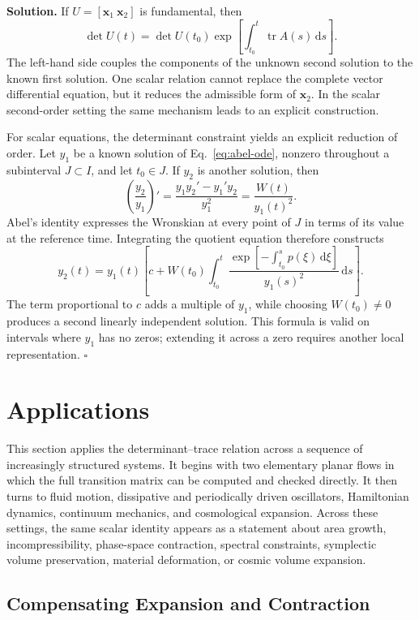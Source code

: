 \documentclass[11pt,a4paper]{article}
\newcommand{\be}{\begin{equation}}
\newcommand{\ee}{\end{equation}}
\newcommand{\lb}[1]{\label{#1}}
\newcommand{\dd}{\mathrm{d}}
\DeclareMathOperator{\tr}{tr}
\theoremstyle{definition}
\newenvironment{solution}
{\par\noindent\textbf{Solution.}}
{\hfill$\square$\par}
\numberwithin{equation}{section}
\begin{document}
\begin{solution}
If $U=[\mathbf{x}_1\ \mathbf{x}_2]$ is fundamental, then
\be
\det U(t)
=
\det U(t_0)
\exp\left[
\int_{t_0}^{t}\tr A(s)\,\dd s
\right].
\lb{eq:known-solution}
\ee
The left-hand side couples the components of the unknown second solution to the known first solution. One scalar relation cannot replace the complete vector differential equation, but it reduces the admissible form of $\mathbf{x}_2$. In the scalar second-order setting the same mechanism leads to an explicit construction.

For scalar equations, the determinant constraint yields an explicit reduction of order. Let $y_1$ be a known solution of Eq.~\eqref{eq:abel-ode}, nonzero throughout a subinterval $J\subset I$, and let $t_0\in J$. If $y_2$ is another solution, then
\be
\left(\frac{y_2}{y_1}\right)'
=\frac{y_1y_2'-y_1'y_2}{y_1^2}
=\frac{W(t)}{y_1(t)^2}.
\lb{eq:reduction-order-ratio}
\ee
Abel's identity expresses the Wronskian at every point of $J$ in terms of its value at the reference time. Integrating the quotient equation therefore constructs
\be
y_2(t)=y_1(t)\left[c+W(t_0)\int_{t_0}^{t}
\frac{\exp[-\int_{t_0}^{s}p(\xi)\,\dd\xi]}{y_1(s)^2}\,\dd s\right].
\lb{eq:reduction-order-formula}
\ee
The term proportional to $c$ adds a multiple of $y_1$, while choosing $W(t_0)\ne0$ produces a second linearly independent solution. This formula is valid on intervals where $y_1$ has no zeros; extending it across a zero requires another local representation.
\end{solution}


\section{Applications}

This section applies the determinant--trace relation across a sequence of increasingly structured systems. It begins with two elementary planar flows in which the full transition matrix can be computed and checked directly. It then turns to fluid motion, dissipative and periodically driven oscillators, Hamiltonian dynamics, continuum mechanics, and cosmological expansion. Across these settings, the same scalar identity appears as a statement about area growth, incompressibility, phase-space contraction, spectral constraints, symplectic volume preservation, material deformation, or cosmic volume expansion.

\subsection{Compensating Expansion and Contraction}
\end{document}
